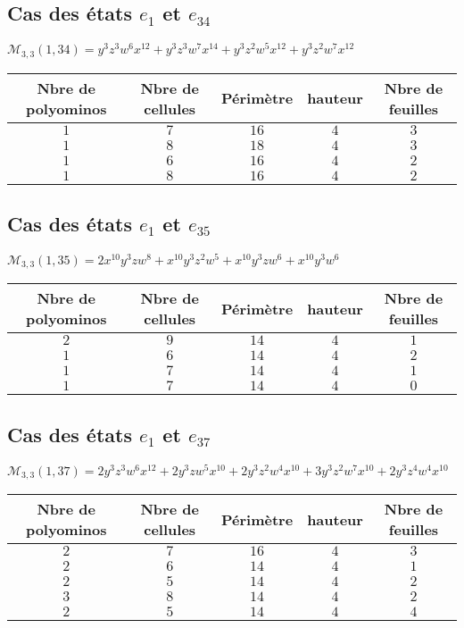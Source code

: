 \documentclass[12pt]{memoireuqam1.3}
\begin{document}
\subsection*{Cas des états $e_{1}$ et $e_{34}$ }
$\mathcal{M}_{3,3}(1,34)=y^3z^3w^6x^{12}+y^3z^3w^7x^{14}+y^3z^2w^5x^{12}+y^3z^2w^7x^{12}
$\\
\begin{tabular}{|c|c|c|c|c|}
 \hline
  Nbre de polyominos & Nbre de cellules & Périmètre & hauteur &Nbre de feuilles\\
 \hline
 $1$ & $7$ & $16$ & $4$ &$3$\\
 \hline
 $1$ & $8$ & $18$ & $4$ &$3$\\
 \hline
 $1$ & $6$ & $16$ & $4$ &$2$\\
 \hline
 $1$ & $8$ & $16$ & $4$ &$2$\\
 \hline
\end{tabular}
\subsection*{Cas des états $e_{1}$ et $e_{35}$ }
$\mathcal{M}_{3,3}(1,35)=2x^{10}y^3zw^8+x^{10}y^3z^2w^5+x^{10}y^3zw^6+x^{10}y^3w^{6}
$\\
\begin{tabular}{|c|c|c|c|c|}
 \hline
  Nbre de polyominos & Nbre de cellules & Périmètre & hauteur &Nbre de feuilles\\
 \hline
 $2$ & $9$ & $14$ & $4$ &$1$\\
 \hline
 $1$ & $6$ & $14$ & $4$ &$2$\\
 \hline
 $1$ & $7$ & $14$ & $4$ &$1$\\
 \hline
 $1$ & $7$ & $14$ & $4$ &$0$\\
 \hline
\end{tabular}
\subsection*{Cas des états $e_{1}$ et $e_{37}$ }
$\mathcal{M}_{3,3}(1,37)=2y^3z^3w^6x^{12}+2y^3zw^5x^{10}+2y^3z^2w^4x^{10}+3y^3z^2w^7x^{10}+2y^3z^4w^4x^{10
}$\\
\begin{tabular}{|c|c|c|c|c|}
 \hline
  Nbre de polyominos & Nbre de cellules & Périmètre & hauteur &Nbre de feuilles\\
 \hline
 $2$ & $7$ & $16$ & $4$ &$3$\\
 \hline
 $2$ & $6$ & $14$ & $4$ &$1$\\
 \hline
 $2$ & $5$ & $14$ & $4$ &$2$\\
 \hline
 $3$ & $8$ & $14$ & $4$ &$2$\\
 \hline
 $2$ & $5$ & $14$ & $4$ &$4$\\
 \hline
\end{tabular}
\end{document}
